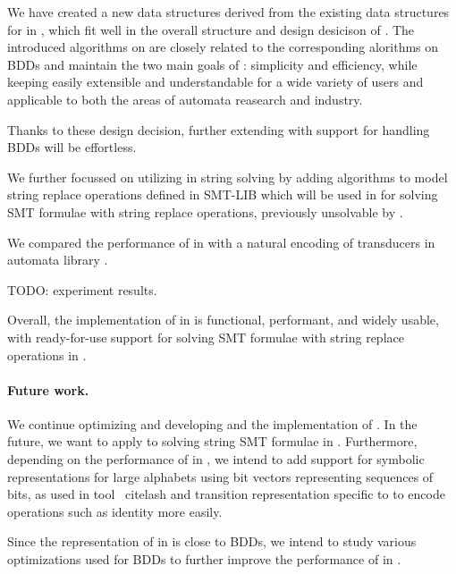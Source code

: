 We have created a new data structures derived from the existing data structures for \nfas in \mata, which fit well in the overall structure and design desicison of \mata.
The introduced algorithms on \nfts are closely related to the corresponding alorithms on BDDs and maintain the two main goals of \mata: simplicity and efficiency, while keeping \mata easily extensible and understandable for a wide variety of users and applicable to both the areas of automata reasearch and industry.

Thanks to these design decision, further extending \mata with support for handling BDDs will be effortless.

We further focussed on utilizing \nfts in string solving by adding algorithms to model string replace operations defined in SMT-LIB which will be used in \noodler for solving SMT formulae with string replace operations, previously unsolvable by \noodler.

We compared the performance of \nfts in \mata with a natural encoding of transducers in automata library \mona.

TODO: experiment results.

Overall, the implementation of \nfts in \mata is functional, performant, and widely usable, with ready-for-use support for solving SMT formulae with string replace operations in \noodler.

\paragraph{Future work.}
We continue optimizing and developing \mata and the implementation of \nfts.
In the future, we want to apply \nfts to solving string SMT formulae in \noodler.
Furthermore, depending on the performance of \nfts in \noodler, we intend to add support for symbolic representations for large alphabets using bit vectors representing sequences of bits, as used in tool \lash~cite{lash} and  transition representation specific to \nfts to encode \nft operations such as identity more easily.

Since the representation of \nfts in \mata is close to BDDs, we intend to study various optimizations used for BDDs to further improve the performance of \nfts in \mata.



% 
